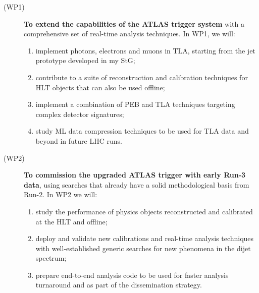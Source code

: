 \begin{description}


\item[(WP1)]  \textbf{To extend the capabilities of the ATLAS trigger system} with a comprehensive set of real-time analysis techniques. 
In WP1, we will:
\begin{enumerate} 
\item implement photons, electrons and muons in TLA, starting from the jet prototype developed in my StG;
\item contribute to a suite of reconstruction and calibration techniques for HLT objects that can also be used offline;
\item implement a combination of PEB and TLA techniques targeting complex detector signatures;
\item study ML data compression techniques to be used for TLA data and beyond in future LHC runs. 
\end{enumerate}
\item[(WP2)] \textbf{To commission the upgraded ATLAS trigger with early Run-3 data}, using searches that already have a solid methodological basis from Run-2. In WP2 we will:
\begin{enumerate} 
\item study the performance of physics objects reconstructed and calibrated at the HLT and offline; 
\item deploy and validate new calibrations and real-time analysis techniques with well-established generic searches for new phenomena in the dijet spectrum;
\item prepare end-to-end analysis code to be used for faster analysis turnaround and as part of the dissemination strategy.  
\end{enumerate} 


\end{description}
